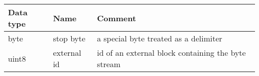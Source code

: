 \documentclass[a4paper]{article}
\begin{document}
\begin{tabular}{|>{\raggedright}p{100pt}|>{\raggedright}p{100pt}|>{\raggedright}p{230pt}|}
\hline
\textbf{Data type} & \textbf{Name} & \textbf{Comment}
\tabularnewline
\hline
byte & stop byte & a special byte treated as a delimiter\tabularnewline
\hline
uint8 & external id & id of an external block containing the byte stream\tabularnewline
\hline
\end{tabular}

% 
% 
% 
% 
% 
% 
% 
% 
% 
\end{document}
